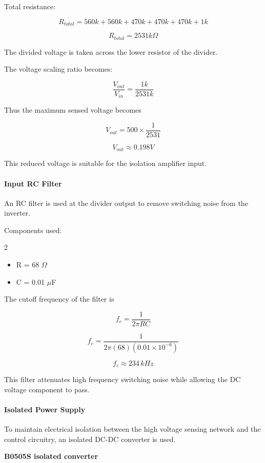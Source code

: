 Total resistance:

\[
R_{total} = 560k + 560k + 470k + 470k + 470k + 1k
\]

\[
R_{total} = 2531k\Omega
\]

The divided voltage is taken across the lower resistor of the divider.

The voltage scaling ratio becomes:

\[
\frac{V_{out}}{V_{in}} = \frac{1k}{2531k}
\]

Thus the maximum sensed voltage becomes

\[
V_{out} = 500 \times \frac{1}{2531}
\]

\[
V_{out} \approx 0.198 V
\]

This reduced voltage is suitable for the isolation amplifier input.

\paragraph{Input RC Filter}

An RC filter is used at the divider output to remove switching noise from the inverter.

Components used:

\begin{multicols}{2}
\begin{itemize}
\item R = 68 $\Omega$
\item C = 0.01 $\mu$F
\end{itemize}
\end{multicols}

The cutoff frequency of the filter is

\[
f_c = \frac{1}{2\pi RC}
\]

\[
f_c = \frac{1}{2\pi (68)(0.01 \times 10^{-6})}
\]

\[
f_c \approx 234\,kHz
\]

This filter attenuates high frequency switching noise while allowing the DC voltage component to pass.

\paragraph{Isolated Power Supply}

To maintain electrical isolation between the high voltage sensing network and the control circuitry, an isolated DC-DC converter is used.

\textbf{B0505S isolated converter}

